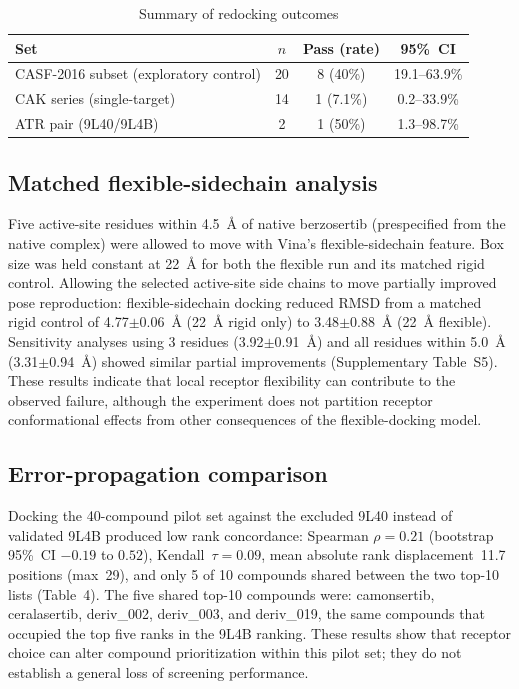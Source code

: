\documentclass[global,twocolumn]{svjour}
\newcommand{\st}{\footnotesize\setlength{\tabcolsep}{3pt}}
\begin{document}
\begin{table}[t]
\centering
\caption{Summary of redocking outcomes}
\label{tab:casf}
\st
\begin{tabular}{lccc}
\toprule
Set & $n$ & Pass (rate) & 95\%~CI \\
\midrule
CASF-2016 subset (exploratory control) & 20 & 8 (40\%)   & 19.1--63.9\% \\
CAK series (single-target)             & 14 & 1 (7.1\%)  & 0.2--33.9\% \\
ATR pair (9L40/9L4B)                   & 2  & 1 (50\%)   & 1.3--98.7\% \\
\bottomrule
\end{tabular}
\end{table}

\subsection{Matched flexible-sidechain analysis}

Five active-site residues within 4.5~\AA{} of native berzosertib (prespecified
from the native complex) were allowed to move with Vina's flexible-sidechain
feature. Box size was held constant at 22~\AA{} for both the flexible run and
its matched rigid control. Allowing the selected active-site side chains to
move partially improved pose reproduction: flexible-sidechain docking reduced
RMSD from a matched rigid control of 4.77$\pm$0.06~\AA{} (22~\AA{} rigid only)
to 3.48$\pm$0.88~\AA{} (22~\AA{} flexible). Sensitivity analyses using 3
residues (3.92$\pm$0.91~\AA{}) and all residues within 5.0~\AA{}
(3.31$\pm$0.94~\AA{}) showed similar partial improvements (Supplementary
Table~S5). These results indicate that local receptor flexibility can
contribute to the observed failure, although the experiment does not partition
receptor conformational effects from other consequences of the flexible-docking
model.

\subsection{Error-propagation comparison}

Docking the 40-compound pilot set against the excluded 9L40 instead of
validated 9L4B produced low rank concordance: Spearman $\rho=0.21$ (bootstrap
95\%~CI $-0.19$ to $0.52$), Kendall~$\tau=0.09$, mean absolute rank
displacement~11.7 positions (max~29), and only 5 of 10 compounds shared
between the two top-10 lists (Table~4). The five shared top-10 compounds were:
camonsertib, ceralasertib, deriv\_002, deriv\_003, and deriv\_019, the same
compounds that occupied the top five ranks in the 9L4B ranking. These results
show that receptor choice can alter compound prioritization within this pilot
set; they do not establish a general loss of screening performance.
\end{document}
